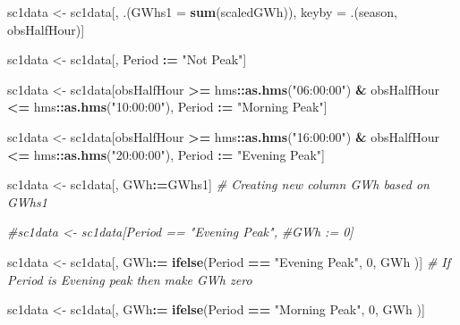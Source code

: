 \documentclass[]{article}
\newenvironment{Shaded}{\begin{snugshade}}{\end{snugshade}}
\newcommand{\KeywordTok}[1]{\textcolor[rgb]{0.13,0.29,0.53}{\textbf{#1}}}
\newcommand{\DataTypeTok}[1]{\textcolor[rgb]{0.13,0.29,0.53}{#1}}
\newcommand{\DecValTok}[1]{\textcolor[rgb]{0.00,0.00,0.81}{#1}}
\newcommand{\StringTok}[1]{\textcolor[rgb]{0.31,0.60,0.02}{#1}}
\newcommand{\CommentTok}[1]{\textcolor[rgb]{0.56,0.35,0.01}{\textit{#1}}}
\newcommand{\OperatorTok}[1]{\textcolor[rgb]{0.81,0.36,0.00}{\textbf{#1}}}
\newcommand{\ErrorTok}[1]{\textcolor[rgb]{0.64,0.00,0.00}{\textbf{#1}}}
\newcommand{\NormalTok}[1]{#1}
\theoremstyle{definition}
\theoremstyle{definition}
\theoremstyle{definition}
\theoremstyle{remark}
\begin{document}
\begin{Shaded}
\begin{Highlighting}[]
\NormalTok{sc1data <-}\StringTok{ }\NormalTok{sc1data[, .(}\DataTypeTok{GWhs1 =} \KeywordTok{sum}\NormalTok{(scaledGWh)), }
\NormalTok{                    keyby =}\StringTok{ }\NormalTok{.(season, obsHalfHour)]}

\NormalTok{sc1data <-}\StringTok{ }\NormalTok{sc1data[, Period }\OperatorTok{:}\ErrorTok{=}\StringTok{ "Not Peak"}\NormalTok{]}

\NormalTok{sc1data <-}\StringTok{ }\NormalTok{sc1data[obsHalfHour }\OperatorTok{>=}\StringTok{ }\NormalTok{hms}\OperatorTok{::}\KeywordTok{as.hms}\NormalTok{(}\StringTok{"06:00:00"}\NormalTok{) }\OperatorTok{&}\StringTok{ }
\StringTok{                     }\NormalTok{obsHalfHour }\OperatorTok{<=}\StringTok{ }\NormalTok{hms}\OperatorTok{::}\KeywordTok{as.hms}\NormalTok{(}\StringTok{"10:00:00"}\NormalTok{),}
\NormalTok{                   Period }\OperatorTok{:}\ErrorTok{=}\StringTok{ "Morning Peak"}\NormalTok{]}

\NormalTok{sc1data <-}\StringTok{ }\NormalTok{sc1data[obsHalfHour }\OperatorTok{>=}\StringTok{ }\NormalTok{hms}\OperatorTok{::}\KeywordTok{as.hms}\NormalTok{(}\StringTok{"16:00:00"}\NormalTok{) }\OperatorTok{&}\StringTok{ }
\StringTok{                     }\NormalTok{obsHalfHour }\OperatorTok{<=}\StringTok{ }\NormalTok{hms}\OperatorTok{::}\KeywordTok{as.hms}\NormalTok{(}\StringTok{"20:00:00"}\NormalTok{),}
\NormalTok{                   Period }\OperatorTok{:}\ErrorTok{=}\StringTok{ "Evening Peak"}\NormalTok{]}

\NormalTok{sc1data <-}\StringTok{ }\NormalTok{sc1data[, GWh}\OperatorTok{:}\ErrorTok{=}\NormalTok{GWhs1] }\CommentTok{# Creating new column GWh based on GWhs1}


\CommentTok{#sc1data <- sc1data[Period == "Evening Peak",}
                   \CommentTok{#GWh := 0]}

\NormalTok{sc1data <-}\StringTok{ }\NormalTok{sc1data[, GWh}\OperatorTok{:}\ErrorTok{=}\StringTok{ }\KeywordTok{ifelse}\NormalTok{(Period }\OperatorTok{==}\StringTok{ "Evening Peak"}\NormalTok{, }\DecValTok{0}\NormalTok{, GWh )] }\CommentTok{# If Period is Evening peak then make GWh zero}
                   
\NormalTok{sc1data <-}\StringTok{ }\NormalTok{sc1data[, GWh}\OperatorTok{:}\ErrorTok{=}\StringTok{ }\KeywordTok{ifelse}\NormalTok{(Period }\OperatorTok{==}\StringTok{ "Morning Peak"}\NormalTok{, }\DecValTok{0}\NormalTok{, GWh )]}






\end{Highlighting}
\end{Shaded}
\end{document}
